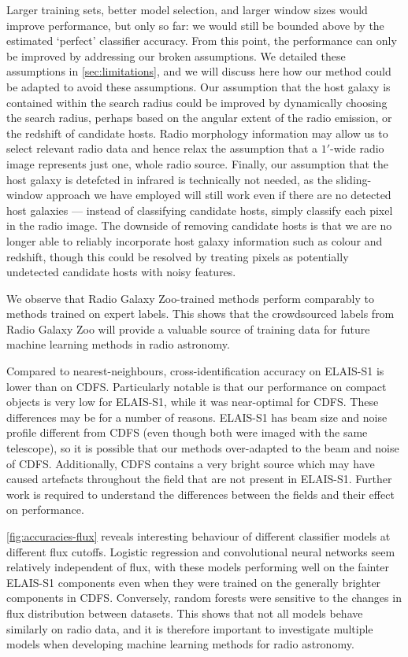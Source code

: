 \documentclass[fleqn,usenatbib,usedcolumn]{mnras}
\newcommand{\edited}[1]{#1}
\begin{document}
  Larger training sets, better model selection, and larger window sizes would
  improve performance, but only so far: we would still be bounded above by the
  estimated `perfect' classifier accuracy. From this point, the performance
  can only be improved by addressing our broken assumptions. We detailed
  these assumptions in \autoref{sec:limitations}, and we will discuss here how
  \edited{our method could be adapted to avoid these assumptions}. Our assumption that the host galaxy is contained
  within the search radius could be improved by dynamically choosing the
  search radius, perhaps based on the angular extent of the radio emission, or the
  redshift of candidate hosts. Radio morphology information may allow us to
  select relevant radio data and hence relax the assumption that a $1'$-wide
  radio image represents just one, whole radio source. Finally, our assumption
  that the host galaxy is detefcted in infrared is technically not needed, as
  the sliding-window approach we have employed will still work even if there
  are no detected host galaxies --- instead of classifying candidate hosts,
  simply classify each pixel in the radio image. The downside of removing
  candidate hosts is that we are no longer able to reliably incorporate host
  galaxy information such as colour and redshift, though this could be
  resolved by treating pixels as potentially undetected candidate hosts with
  noisy features.

  We observe that Radio Galaxy Zoo-trained methods perform comparably to
  methods trained on expert labels. This shows that the crowdsourced labels
  from Radio Galaxy Zoo will provide a valuable source of training
  data for future machine learning methods in radio astronomy.

  Compared to nearest-neighbours, cross-identification accuracy on ELAIS-S1 is
  lower than on CDFS. Particularly notable is that our performance on compact
  objects is very low for ELAIS-S1, while it was near-optimal for CDFS. These
  differences may be for a number of reasons. ELAIS-S1 has beam size and noise
  profile different from CDFS (even though both were imaged with the same
  telescope), so it is possible that our methods over-adapted to the beam and
  noise of CDFS. Additionally, CDFS contains a very bright source which may
  have caused artefacts throughout the field that are not present in ELAIS-S1.
  Further work is required to understand the differences between the fields
  and their effect on performance.

  \autoref{fig:accuracies-flux} reveals interesting behaviour of different
  classifier models at different flux cutoffs. Logistic regression and
  convolutional neural networks seem relatively independent of flux, with
  these models performing well on the fainter ELAIS-S1 components even when
  they were trained on the generally brighter components in CDFS. Conversely,
  random forests were sensitive to the changes in flux distribution between
  datasets. This shows that not all models behave similarly on radio data,
  and it is therefore important to investigate multiple models when
  developing machine learning methods for radio astronomy.
\end{document}
